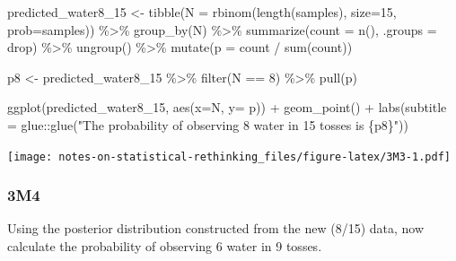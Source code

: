 \documentclass[
]{book}
\newenvironment{Shaded}{\begin{snugshade}}{\end{snugshade}}
\newcommand{\AttributeTok}[1]{\textcolor[rgb]{0.77,0.63,0.00}{#1}}
\newcommand{\DecValTok}[1]{\textcolor[rgb]{0.00,0.00,0.81}{#1}}
\newcommand{\FunctionTok}[1]{\textcolor[rgb]{0.00,0.00,0.00}{#1}}
\newcommand{\NormalTok}[1]{#1}
\newcommand{\OtherTok}[1]{\textcolor[rgb]{0.56,0.35,0.01}{#1}}
\newcommand{\SpecialCharTok}[1]{\textcolor[rgb]{0.00,0.00,0.00}{#1}}
\newcommand{\StringTok}[1]{\textcolor[rgb]{0.31,0.60,0.02}{#1}}
\begin{document}
\begin{Shaded}
\begin{Highlighting}[]
\NormalTok{predicted\_water8\_15 }\OtherTok{\textless{}{-}} 
  \FunctionTok{tibble}\NormalTok{(}\AttributeTok{N =} \FunctionTok{rbinom}\NormalTok{(}\FunctionTok{length}\NormalTok{(samples), }\AttributeTok{size=}\DecValTok{15}\NormalTok{, }\AttributeTok{prob=}\NormalTok{samples)) }\SpecialCharTok{\%\textgreater{}\%}
  \FunctionTok{group\_by}\NormalTok{(N) }\SpecialCharTok{\%\textgreater{}\%}
  \FunctionTok{summarize}\NormalTok{(}\AttributeTok{count =} \FunctionTok{n}\NormalTok{(), }\AttributeTok{.groups =} \StringTok{\textquotesingle{}drop\textquotesingle{}}\NormalTok{)  }\SpecialCharTok{\%\textgreater{}\%}
  \FunctionTok{ungroup}\NormalTok{() }\SpecialCharTok{\%\textgreater{}\%}
  \FunctionTok{mutate}\NormalTok{(}\AttributeTok{p =}\NormalTok{ count }\SpecialCharTok{/} \FunctionTok{sum}\NormalTok{(count))}
  
\NormalTok{p8 }\OtherTok{\textless{}{-}} 
\NormalTok{  predicted\_water8\_15 }\SpecialCharTok{\%\textgreater{}\%}
  \FunctionTok{filter}\NormalTok{(N }\SpecialCharTok{==} \DecValTok{8}\NormalTok{) }\SpecialCharTok{\%\textgreater{}\%}
  \FunctionTok{pull}\NormalTok{(p)}

\FunctionTok{ggplot}\NormalTok{(predicted\_water8\_15, }\FunctionTok{aes}\NormalTok{(}\AttributeTok{x=}\NormalTok{N, }\AttributeTok{y=}\NormalTok{ p)) }\SpecialCharTok{+} 
    \FunctionTok{geom\_point}\NormalTok{() }\SpecialCharTok{+} 
  \FunctionTok{labs}\NormalTok{(}\AttributeTok{subtitle =}\NormalTok{ glue}\SpecialCharTok{::}\FunctionTok{glue}\NormalTok{(}\StringTok{"The probability of observing 8 water in 15 tosses is \{p8\}"}\NormalTok{))}
\end{Highlighting}
\end{Shaded}

\texttt{[image: notes-on-statistical-rethinking\_files/figure-latex/3M3-1.pdf]}

\hypertarget{m4-1}{%
\subsubsection*{3M4}\label{m4-1}}

Using the posterior distribution constructed from the new (8/15) data, now calculate the probability of observing 6 water in 9 tosses.
\end{document}
